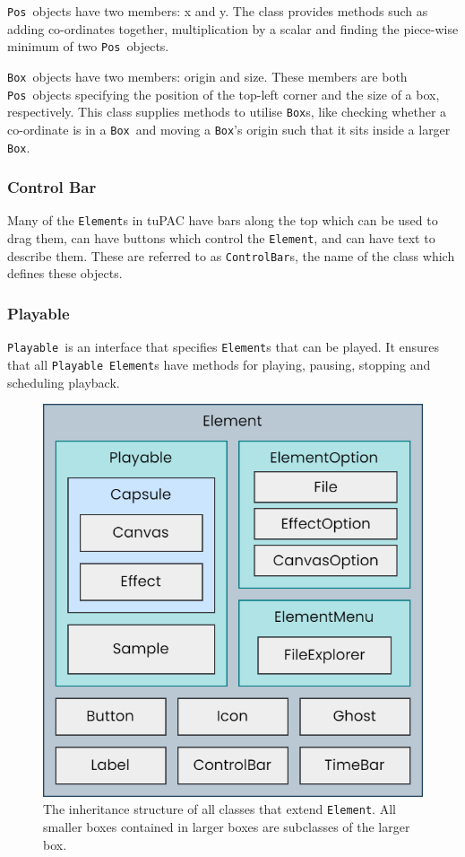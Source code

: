 \documentclass[12pt,a4paper,oneside,openright]{report}
\newcommand{\element}{\texttt{Element}}
\newcommand{\pos}{\texttt{Pos}}
\newcommand{\boxT}{\texttt{Box}}
\newcommand{\controlbar}{\texttt{ControlBar}}
\newcommand{\playable}{\texttt{Playable}}
\begin{document}
\pos\ objects have two members: x and y. The class provides methods such as adding co-ordinates together, multiplication by a scalar and finding the piece-wise minimum of two \pos\ objects.

\boxT\ objects have two members: origin and size. These members are both \pos\ objects specifying the position of the top-left corner and the size of a box, respectively. This class supplies methods to utilise \boxT s, like checking whether a co-ordinate is in a \boxT\ and moving a \boxT's origin such that it sits inside a larger \boxT.

\subsubsection{Control Bar}
Many of the \element s in tuPAC have bars along the top which can be used to drag them, can have buttons which control the \element, and can have text to describe them. These are referred to as \controlbar s, the name of the class which defines these objects.

\subsubsection{Playable}
\playable\ is an interface that specifies \element s that can be played. It ensures that all \playable\ \element s have methods for playing, pausing, stopping and scheduling playback.

\begin{figure}[h]
    \centering
    \includegraphics[scale=0.4]{images/tupac_class_structure.png}
    \caption{The inheritance structure of all classes that extend \element. All smaller boxes contained in larger boxes are subclasses of the larger box.}
    \label{fig:element_inheritance}
\end{figure}
\end{document}
